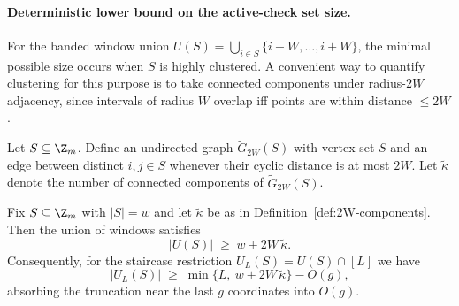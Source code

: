 %
%

\paragraph{Deterministic lower bound on the active-check set size.}
For the banded window union $U(S)=\bigcup_{i\in S}\{i-W,\dots,i+W\}$, the minimal possible size occurs when $S$ is highly
clustered.
A convenient way to quantify clustering for this purpose is to take connected components under radius-$2W$ adjacency, since
intervals of radius $W$ overlap iff points are within distance $\le 2W$.

\begin{definition}
\label{def:2W-components}
Let $S\subseteq \Z_m$.
Define an undirected graph $\widetilde G_{2W}(S)$ with vertex set $S$ and an edge between distinct $i,j\in S$ whenever
their cyclic distance is at most $2W$.
Let $\widetilde\kappa$ denote the number of connected components of $\widetilde G_{2W}(S)$.
\end{definition}

\begin{lemma}
\label{lem:U-size-lower}
Fix $S\subseteq \Z_m$ with $|S|=w$ and let $\widetilde\kappa$ be as in Definition~\ref{def:2W-components}.
Then the union of windows satisfies
\[
|U(S)| \;\ge\; w + 2W\,\widetilde\kappa.
\]
Consequently, for the staircase restriction $U_L(S)=U(S)\cap[L]$ we have
\[
|U_L(S)| \;\ge\; \min\{L,\ w + 2W\,\widetilde\kappa\} - O(g),
\]
absorbing the truncation near the last $g$ coordinates into $O(g)$.
\end{lemma}

